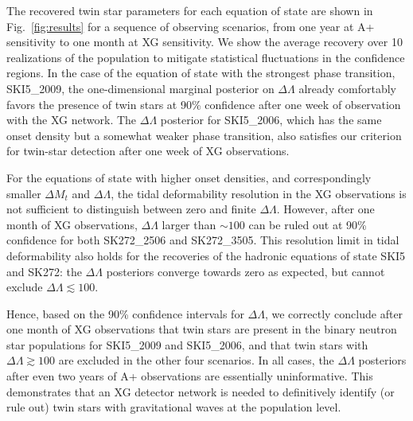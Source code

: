 \documentclass[aps,prd,twocolumn,superscriptaddress,nofootinbib]{revtex4-1}
\begin{document}
The recovered twin star parameters for each equation of state are shown in Fig.~\ref{fig:results} for a sequence of observing scenarios, from one year at A+ sensitivity to one month at XG sensitivity. We show the average recovery over 10 realizations of the population to mitigate statistical fluctuations in the confidence regions. 
In the case of the equation of state with the strongest phase transition, SKI5\_2009, the one-dimensional marginal posterior on $\Delta\Lambda$ already comfortably favors the presence of twin stars at 90\% confidence after one week of observation with the XG network. The $\Delta\Lambda$ posterior for SKI5\_2006, which has the same onset density but a somewhat weaker phase transition, also satisfies our criterion for twin-star detection after one week of XG observations.

For the equations of state with higher onset densities, and correspondingly smaller $\Delta M_t$ and $\Delta\Lambda$, the tidal deformability resolution in the XG observations is not sufficient to distinguish between zero and finite $\Delta\Lambda$. However, after one month of XG observations, $\Delta\Lambda$ larger than $\sim 100$ can be ruled out at 90\% confidence for both SK272\_2506 and SK272\_3505. This resolution limit in tidal deformability also holds for the recoveries of the hadronic equations of state SKI5 and SK272: the $\Delta\Lambda$ posteriors converge towards zero as expected, but cannot exclude $\Delta\Lambda \lesssim 100$.

Hence, based on the 90\% confidence intervals for $\Delta\Lambda$, we correctly conclude after one month of XG observations that twin stars are present in the binary neutron star populations for SKI5\_2009 and SKI5\_2006, and that twin stars with $\Delta\Lambda \gtrsim 100$ are excluded in the other four scenarios. In all cases, the $\Delta\Lambda$ posteriors after even two years of A+ observations are essentially uninformative. This demonstrates that an XG detector network is needed to definitively identify (or rule out) twin stars with gravitational waves at the population level.
\end{document}
